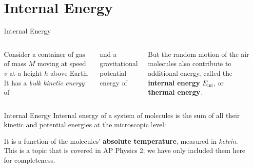 \documentclass[12pt,compress,aspectratio=169]{beamer}
\begin{document}
\section{Internal Energy}

\begin{frame}{Internal Energy}
  \begin{columns}

    Consider a container of gas of mass $M$ moving at speed $v$ at a height $h$
    above Earth. It has a \emph{bulk kinetic energy} of

    
    and a gravitational potential energy of


    \vspace{-.1in}But the random motion of the air molecules also contribute to
    additional energy, called the \textbf{internal energy} $E_\text{int}$, or
    \textbf{thermal energy}.
  \end{columns}
\end{frame}



\begin{frame}{Internal Energy}
  Internal energy of a system of molecules is the sum of all their kinetic and
  potential energies at the microscopic level:


  It is a function of the molecules' \textbf{absolute temperature}, measured in
  \emph{kelvin}. This is a topic that is covered in AP Physics 2; we have only
  included them here for completeness.
\end{frame}
\end{document}
